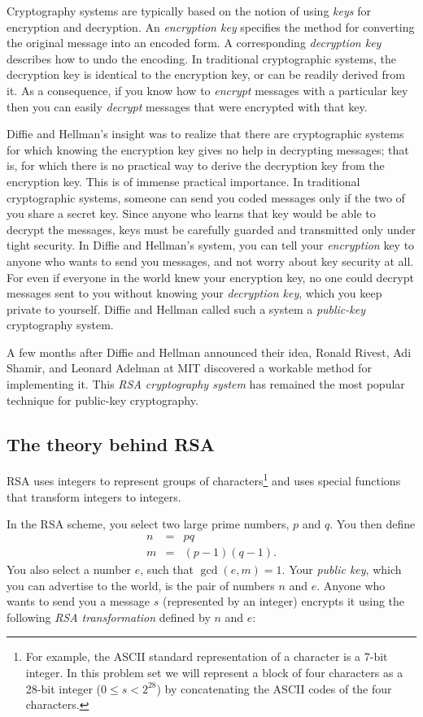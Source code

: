 Cryptography systems are typically based on the notion of using {\it
keys} for encryption and decryption.  An {\it encryption key}
specifies the method for converting the original message into an
encoded form.  A corresponding {\it decryption key} describes how to
undo the encoding.  In traditional cryptographic systems, the
decryption key is identical to the encryption key, or can be readily
derived from it.  As a consequence, if you know how to {\it encrypt}
messages with a particular key then you can easily {\it decrypt}
messages that were encrypted with that key.

Diffie and Hellman's insight was to realize that there are
cryptographic systems for which knowing the encryption key gives no
help in decrypting messages; that is, for which there is no practical
way to derive the decryption key from the encryption key.  This is of
immense practical importance.  In traditional cryptographic systems,
someone can send you coded messages only if the two of you share a
secret key.  Since anyone who learns that key would be able to decrypt
the messages, keys must be carefully guarded and transmitted only
under tight security.  In Diffie and Hellman's system, you can tell
your {\it encryption} key to anyone who wants to send you messages,
and not worry about key security at all.  For even if everyone in the
world knew your encryption key, no one could decrypt messages sent to
you without knowing your {\it decryption key}, which you keep private
to yourself.  Diffie and Hellman called such a system a {\it
public-key} cryptography system.

A few months after Diffie and Hellman announced their idea, Ronald
Rivest, Adi Shamir, and Leonard Adelman at MIT discovered a workable
method for implementing it.  This {\it RSA cryptography system} has
remained the most popular technique for public-key cryptography.


\subsection{The theory behind RSA}

RSA uses integers to represent groups of characters\footnote{For
example, the ASCII standard representation of a character is a 7-bit
integer.  In this problem set we will represent a block of four
characters as a 28-bit integer ($0 \leq s < 2^{28}$) by concatenating
the ASCII codes of the four characters.} and uses special
functions that transform integers to integers.

In the RSA scheme, you select two large prime numbers, $p$ and $q$.
You then define
\begin{eqnarray}
n&=& pq\\
m&=&(p - 1)(q - 1).
\end{eqnarray}
You also select a number $e$, such that $\gcd(e,m)=1$.  Your {\it
public key}, which you can advertise to the world, is the pair of
numbers $n$ and $e$.  Anyone who wants to send you a message $s$
(represented by an integer) encrypts it using the following {\it RSA
transformation} defined by $n$ and $e$:

